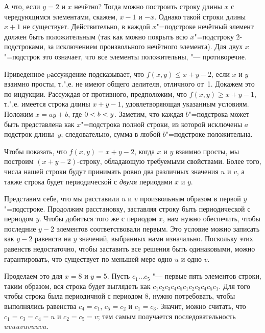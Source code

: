 \documentclass[twoside]{book}
\begin{document}
А что, если $y=2$ и $x$ нечётно?
Тогда можно построить строку длины $x$ с чередующимся элементами, скажем, $x-1$ и $-x$.
Однако такой строки длины $x+1$ не существует.
Действительно, в каждой $x$"=подстроке нечётный элемент должен быть положительным 
(так как можно покрыть всю $x$"=подстроку 2-подстроками, за исключением произвольного нечётного элемента).
Для двух $x$"=подстрок это означает, что все элементы положительны, "---
противоречие.

Приведенное pассуждение подсказывает, что $f(x,y)\le x+y-2$, если $x$ и $y$ взаимно просты, 
т.",е. не имеют общего делителя, отличного от~1.
Докажем это по индукции.
Рассуждая от противного, предположим, что $f(x,y)\ge x+y-1$,
т.",е. имеется строка длины $x+y-1$, удовлетворяющая указанным условиям.
Положим $x=ay+b$, где $0\z<b\z<y$.
Заметим, что каждая $b$"=подстрока %
может быть представлена как $x$"=подстрока полной строки, 
из которой исключены $a$ подстрок длины~$y$; 
следовательно, сумма в любой $b$"=подстроке положительна.

Чтобы показать, что $f(x,y)=x+y-2$, когда $x$ и $y$ взаимно просты, мы построим $(x+y-2)$-строку, обладающую требуемыми свойствами.
Более того, числа нашей строки будут принимать ровно два различных значения $u$ и $v$,
а также строка будет периодической с \emph{двумя} периодами $x$ и $y$.

Представим себе, что мы расставили $u$ и $v$ произвольным образом в первой $y$"=подстроке.
Продолжим расстановку, заставляя строку быть периодической с периодом $y$.
Чтобы добиться того же с периодом $x$,
нам нужно обеспечить, чтобы последние $y-2$ элементов соответствовали первым.
Это условие можно записать как $y-2$ равенств на $y$ значений, выбранных нами изначально.
Поскольку этих равенств недостаточно, чтобы заставить все решения быть одинаковыми, можно гарантировать, что существует по меньшей мере одно $u$ и одно $v$.

Проделаем это для $x=8$ и $y=5$.
Пусть $c_1\dots c_5$ "--- первые пять элементов строки, 
таким образом, вся строка будет выглядеть как
$c_1c_2c_3c_4c_5c_1c_2c_3c_4c_5c_1$.
Для того чтобы строка была периодичной с периодом 8, 
нужно потребовать, чтобы выполнялись равенства $c_4=c_1$, $c_5=c_2$ и $c_1=c_3$.
Значит, можно считать, что $c_1=c_3=c_4=u$ и $c_2=c_5=v$; 
тем самым получается последовательность $uvuuvuvuuvu$.
\end{document}
